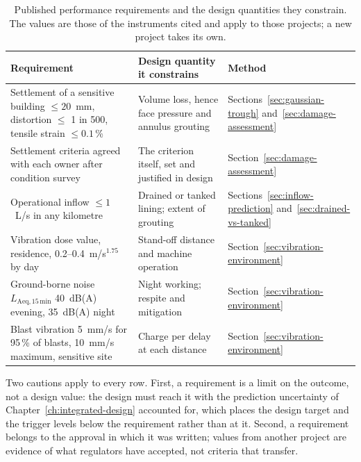 \begin{table}[htbp]
\caption{Published performance requirements and the design quantities they
constrain. The values are those of the instruments cited and apply to those
projects; a new project takes its own.}
\label{tab:requirements-design}
\centering
\small
\begin{tabularx}{\textwidth}{>{\raggedright\arraybackslash}p{} >{\raggedright\arraybackslash}X >{\raggedright\arraybackslash}p{}}
\toprule
\textbf{Requirement} & \textbf{Design quantity it constrains} & \textbf{Method} \\
\midrule
Settlement of a sensitive building $\leq 20$~mm, distortion $\leq$ 1 in 500, tensile strain $\leq 0.1$\,\% \citep{nsw2020m4m5coa} & Volume loss, hence face pressure and annulus grouting & Sections~\ref{sec:gaussian-trough} and~\ref{sec:damage-assessment} \\
Settlement criteria agreed with each owner after condition survey \citep{wda2017ees} & The criterion itself, set and justified in design & Section~\ref{sec:damage-assessment} \\
Operational inflow $\leq 1$~L/s in any kilometre \citep{nsw2020m4m5coa} & Drained or tanked lining; extent of grouting & Sections~\ref{sec:inflow-prediction} and~\ref{sec:drained-vs-tanked} \\
Vibration dose value, residence, 0.2--0.4~m/s$^{1.75}$ by day \citep{wda2017ees} & Stand-off distance and machine operation & Section~\ref{sec:vibration-environment} \\
Ground-borne noise $L_{\mathrm{Aeq},15\,\mathrm{min}}$ 40~dB(A) evening, 35~dB(A) night \citep{wda2017ees,nsw2020m4m5coa} & Night working; respite and mitigation & Section~\ref{sec:vibration-environment} \\
Blast vibration 5~mm/s for 95\,\% of blasts, 10~mm/s maximum, sensitive site \citep{wda2017ees} & Charge per delay at each distance & Section~\ref{sec:vibration-environment} \\
\bottomrule
\end{tabularx}
\end{table}

Two cautions apply to every row. First, a requirement is a limit on the outcome, not
a design value: the design must reach it with the prediction uncertainty of
Chapter~\ref{ch:integrated-design} accounted for, which places the design
target and the trigger levels below the requirement rather than at it. Second, a
requirement belongs to the approval in which it was written; values from
another project are evidence of what regulators have accepted, not criteria
that transfer.


